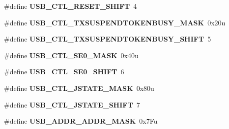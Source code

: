 \begin{DoxyCompactItemize}
\item 
\#define {\bfseries U\+S\+B\+\_\+\+C\+T\+L\+\_\+\+R\+E\+S\+E\+T\+\_\+\+S\+H\+I\+FT}~4\hypertarget{group__USB__Register__Masks_gac709cb60252fd6ab2775785ffc2953e6}{}\label{group__USB__Register__Masks_gac709cb60252fd6ab2775785ffc2953e6}

\item 
\#define {\bfseries U\+S\+B\+\_\+\+C\+T\+L\+\_\+\+T\+X\+S\+U\+S\+P\+E\+N\+D\+T\+O\+K\+E\+N\+B\+U\+S\+Y\+\_\+\+M\+A\+SK}~0x20u\hypertarget{group__USB__Register__Masks_gaa2e78edccdce1268888d45bc4d81cfe1}{}\label{group__USB__Register__Masks_gaa2e78edccdce1268888d45bc4d81cfe1}

\item 
\#define {\bfseries U\+S\+B\+\_\+\+C\+T\+L\+\_\+\+T\+X\+S\+U\+S\+P\+E\+N\+D\+T\+O\+K\+E\+N\+B\+U\+S\+Y\+\_\+\+S\+H\+I\+FT}~5\hypertarget{group__USB__Register__Masks_gac6b9a4253ee9f3740d0c7b2692a44e8e}{}\label{group__USB__Register__Masks_gac6b9a4253ee9f3740d0c7b2692a44e8e}

\item 
\#define {\bfseries U\+S\+B\+\_\+\+C\+T\+L\+\_\+\+S\+E0\+\_\+\+M\+A\+SK}~0x40u\hypertarget{group__USB__Register__Masks_gac4c2c3ef09a72faaab7151297e8dfbe7}{}\label{group__USB__Register__Masks_gac4c2c3ef09a72faaab7151297e8dfbe7}

\item 
\#define {\bfseries U\+S\+B\+\_\+\+C\+T\+L\+\_\+\+S\+E0\+\_\+\+S\+H\+I\+FT}~6\hypertarget{group__USB__Register__Masks_gaa3a02fa6ec226d10d54353456d44fa88}{}\label{group__USB__Register__Masks_gaa3a02fa6ec226d10d54353456d44fa88}

\item 
\#define {\bfseries U\+S\+B\+\_\+\+C\+T\+L\+\_\+\+J\+S\+T\+A\+T\+E\+\_\+\+M\+A\+SK}~0x80u\hypertarget{group__USB__Register__Masks_ga3a56395d81066c161d523479ed340907}{}\label{group__USB__Register__Masks_ga3a56395d81066c161d523479ed340907}

\item 
\#define {\bfseries U\+S\+B\+\_\+\+C\+T\+L\+\_\+\+J\+S\+T\+A\+T\+E\+\_\+\+S\+H\+I\+FT}~7\hypertarget{group__USB__Register__Masks_gad553773ca9a02b344ab10269c999d143}{}\label{group__USB__Register__Masks_gad553773ca9a02b344ab10269c999d143}

\item 
\#define {\bfseries U\+S\+B\+\_\+\+A\+D\+D\+R\+\_\+\+A\+D\+D\+R\+\_\+\+M\+A\+SK}~0x7\+Fu\hypertarget{group__USB__Register__Masks_ga7ccfd8bde2bb3831d13280315df4501c}{}\label{group__USB__Register__Masks_ga7ccfd8bde2bb3831d13280315df4501c}


\end{DoxyCompactItemize}
